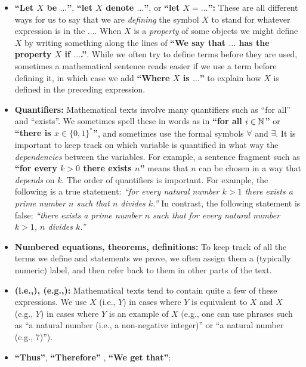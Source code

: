 \begin{itemize}
\item
  \textbf{``Let \(X\) be \(\ldots\)''}, \textbf{``let \(X\) denote
  \(\ldots\)''}, or \textbf{``let \(X= \ldots\)'':} These are all
  different ways for us to say that we are \emph{defining} the symbol
  \(X\) to stand for whatever expression is in the \(\ldots\). When
  \(X\) is a \emph{property} of some objects we might define \(X\) by
  writing something along the lines of \textbf{``We say that \(\ldots\)
  has the property \(X\) if \(\ldots\).''}. While we often try to define
  terms before they are used, sometimes a mathematical sentence reads
  easier if we use a term before defining it, in which case we add
  \textbf{``Where \(X\) is \(\ldots\)''} to explain how \(X\) is defined
  in the preceding expression.
\item
  \textbf{Quantifiers:} Mathematical texts involve many quantifiers such
  as ``for all'' and ``exists''. We sometimes spell these in words as in
  \textbf{``for all \(i\in{\mathbb{N}}\)''} or \textbf{``there is
  \(x\in \{0,1\}^*\)''}, and sometimes use the formal symbols
  \(\forall\) and \(\exists\). It is important to keep track on which
  variable is quantified in what way the \emph{dependencies} between the
  variables. For example, a sentence fragment such as \textbf{``for
  every \(k >0\) there exists \(n\)''} means that \(n\) can be chosen in
  a way that \emph{depends} on \(k\). The order of quantifiers is
  important. For example, the following is a true statement: \emph{``for
  every natural number \(k>1\) there exists a prime number \(n\) such
  that \(n\) divides \(k\).''} In contrast, the following statement is
  false: \emph{``there exists a prime number \(n\) such that for every
  natural number \(k>1\), \(n\) divides \(k\).''}
\item
  \textbf{Numbered equations, theorems, definitions:} To keep track of
  all the terms we define and statements we prove, we often assign them
  a (typically numeric) label, and then refer back to them in other
  parts of the text.
\item
  \textbf{(i.e.,), (e.g.,):} Mathematical texts tend to contain quite a
  few of these expressions. We use \(X\) (i.e., \(Y\)) in cases where
  \(Y\) is equivalent to \(X\) and \(X\) (e.g., \(Y\)) in cases where
  \(Y\) is an example of \(X\) (e.g., one can use phrases such as ``a
  natural number (i.e., a non-negative integer)'' or ``a natural number
  (e.g., \(7\))'').
\item
  \textbf{``Thus''}, \textbf{``Therefore''} , \textbf{``We get that''}:

\end{itemize}

